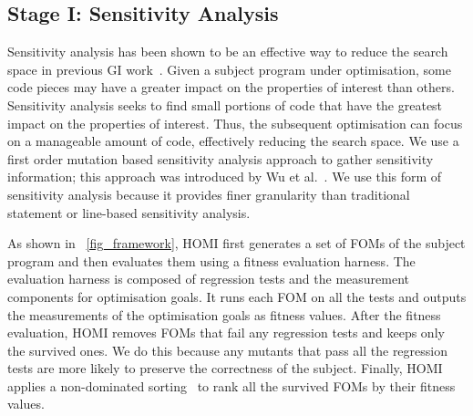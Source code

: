 \documentclass[oribibl]{llncs}
\begin{document}
\vspace{-7mm}

\subsection{Stage I: Sensitivity Analysis}
\label{sec_sensitivity}

Sensitivity analysis has been shown to be an effective way to reduce the search space in previous GI work~\cite{6733370,Bruce:2015:REC:2739480.2754752,6035728}. Given a subject program under optimisation, some code pieces may have a greater impact on the properties of interest than others. Sensitivity analysis seeks to find small portions of code that have the greatest impact on the properties of interest. Thus, the subsequent optimisation  can focus on a manageable amount of code, effectively reducing the search space. We use a first order mutation based sensitivity analysis approach to gather sensitivity information; this approach was introduced by Wu et al.~\cite{Wu:2015:DPO:2739480.2754648}. We use this form of sensitivity analysis because it provides finer granularity than traditional statement or line-based sensitivity analysis.  




As shown in \figurename~\ref{fig_framework}, HOMI first generates a set of FOMs of the subject program and then evaluates them using a fitness evaluation harness. The evaluation harness is composed of regression tests and the measurement components for optimisation goals. It runs each FOM on all the tests and outputs the measurements of the optimisation goals as fitness values.  After the fitness evaluation, HOMI removes FOMs that fail any regression tests and keeps only the survived ones. We do this because any mutants that pass all the regression tests are more likely to preserve the correctness of the subject. Finally, HOMI applies a non-dominated sorting~\cite{996017} to rank all the survived FOMs by their fitness values.
 
\end{document}

